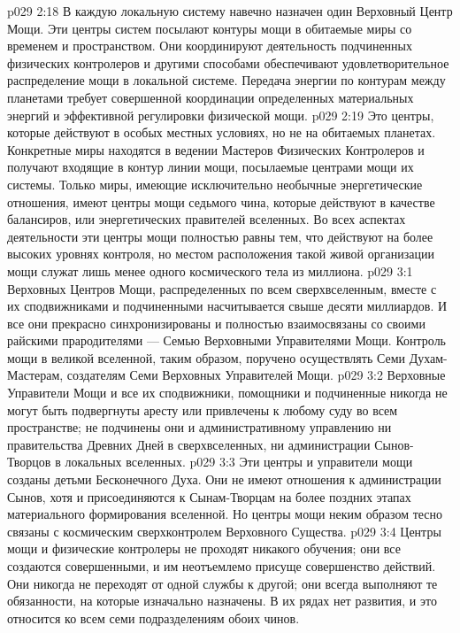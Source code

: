 \vs p029 2:18 \pc {}\bibnobreakspace {} В каждую локальную систему навечно назначен один Верховный Центр Мощи. Эти центры систем посылают контуры мощи в обитаемые миры со временем и пространством. Они координируют деятельность подчиненных физических контролеров и другими способами обеспечивают удовлетворительное распределение мощи в локальной системе. Передача энергии по контурам между планетами требует совершенной координации определенных материальных энергий и эффективной регулировки физической мощи.
\vs p029 2:19 \pc {}\bibnobreakspace {} Это центры, которые действуют в особых местных условиях, но не на обитаемых планетах. Конкретные миры находятся в ведении Мастеров Физических Контролеров и получают входящие в контур линии мощи, посылаемые центрами мощи их системы. Только миры, имеющие исключительно необычные энергетические отношения, имеют центры мощи седьмого чина, которые действуют в качестве балансиров, или энергетических правителей вселенных. Во всех аспектах деятельности эти центры мощи полностью равны тем, что действуют на более высоких уровнях контроля, но местом расположения такой живой организации мощи служат лишь менее одного космического тела из миллиона.
\vs p029 3:1 Верховных Центров Мощи, распределенных по всем сверхвселенным, вместе с их сподвижниками и подчиненными насчитывается свыше десяти миллиардов. И все они прекрасно синхронизированы и полностью взаимосвязаны со своими райскими прародителями --- Семью Верховными Управителями Мощи. Контроль мощи в великой вселенной, таким образом, поручено осуществлять Семи Духам\hyp{}Мастерам, создателям Семи Верховных Управителей Мощи.
\vs p029 3:2 Верховные Управители Мощи и все их сподвижники, помощники и подчиненные никогда не могут быть подвергнуты аресту или привлечены к любому суду во всем пространстве; не подчинены они и административному управлению ни правительства Древних Дней в сверхвселенных, ни администрации Сынов\hyp{}Творцов в локальных вселенных.
\vs p029 3:3 Эти центры и управители мощи созданы детьми Бесконечного Духа. Они не имеют отношения к администрации Сынов, хотя и присоединяются к Сынам\hyp{}Творцам на более поздних этапах материального формирования вселенной. Но центры мощи неким образом тесно связаны с космическим сверхконтролем Верховного Существа.
\vs p029 3:4 \pc Центры мощи и физические контролеры не проходят никакого обучения; они все создаются совершенными, и им неотъемлемо присуще совершенство действий. Они никогда не переходят от одной службы к другой; они всегда выполняют те обязанности, на которые изначально назначены. В их рядах нет развития, и это относится ко всем семи подразделениям обоих чинов.
